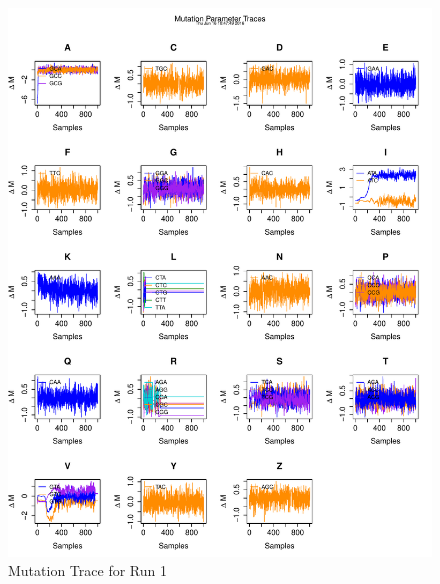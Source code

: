 \documentclass[11pt]{labbook}
\begin{document}
\begin{itemize}
        \begin{figure}
            \centering
            \includegraphics[scale=.65]{FONSE_Plots/2016/June_16/Run1_MutationTrace}
            \caption{Mutation Trace for Run 1}
            \label{fig:JUN16_MUT_R1}
        \end{figure}
        \begin{figure}
            \centering

\end{figure}
\end{itemize}
\end{document}
